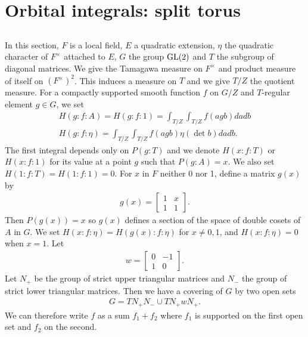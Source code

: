 \section{Orbital integrals: split torus}

\subsection{}
In this section, $F$ is a local field, $E$ a quadratic extension, $\eta$ the quadratic character of $F^\times$ attached to $E$, $G$ the group $\mathrm{GL}(2)$ and $T$ the subgroup of diagonal matrices.
We give the Tamagawa measure on $F^\times$ and product measure of itself on ${(F^{\times})}^2$.
This induces a measure on $T$ and we give $T/Z$ the quotient measure.
For a compactly supported smooth function $f$ on $G/Z$ and $T$-regular element $g \in G$, we set
\begin{align}
    H(g:f:A) = H(g:f:1) = \int_{T/Z} \int_{T/Z} f(agb) dadb \\
    H(g:f:\eta) = \int_{T/Z} \int_{T/Z} f(agb) \eta(\det b) dadb.
\end{align}
The first integral depends only on $P(g:T)$ and we denote $H(x:f:T)$ or $H(x:f:1)$ for its value at a point $g$ such that $P(g:A) = x$.
We also set $H(1:f:T) = H(1:f:1) = 0$.
For $x$ in $F$ neither 0 nor 1,   define a matrix $g(x)$ by
\begin{align}
    g(x) = \begin{bmatrix}
    1 & x \\ 1 & 1
    \end{bmatrix}.
\end{align}
Then $P(g(x)) = x$ so $g(x)$ defines a section of the space of double cosets of $A$ in $G$.
We set $H(x:f:\eta) = H(g(x):f:\eta)$ for $x \neq 0, 1$, and $H(x:f:\eta) = 0$ when $x = 1$.
Let
\begin{align}
    w = \begin{bmatrix}
        0 & -1 \\ 1 & 0        
    \end{bmatrix}.
\end{align}
Let $N_{+}$ be the group of strict upper triangular matrices and $N_{-}$ the group of strict lower triangular matrices.
Then we have a covering of $G$ by two open sets
\begin{align}
\label{3.1.5}
    G = TN_{+}N_{-} \cup TN_{+}wN_{+}.
\end{align}
We can therefore write $f$ as a sum $f_1 + f_2$ where $f_1$ is supported on the first open set and $f_2$ on the second.
